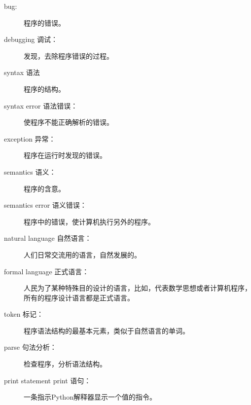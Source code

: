\documentclass[10pt]{book}
\begin{document}
\begin{description}
\item[bug:] 程序的错误。

\item[debugging 调试：]发现，去除程序错误的过程。

\item[syntax 语法] 程序的结构。

\item[syntax error 语法错误：]使程序不能正确解析的错误。


\item[exception 异常：]程序在运行时发现的错误。

\item[semantics  语义：]程序的含意。

\item[semantics error 语义错误：] 程序中的错误，使计算机执行另外的程序。

\item[natural language 自然语言：]人们日常交流用的语言，自然发展的。

\item[formal language 正式语言：]人民为了某种特殊目的设计的语言，比如，代表数学思想或者计算机程序，所有的程序设计语言都是正式语言。

\item[token 标记：]程序语法结构的最基本元素，类似于自然语言的单词。

\item[parse 句法分析：]检查程序，分析语法结构。

\item[print statement print 语句：]一条指示Python解释器显示一个值的指令。


\end{description}
\end{document}
